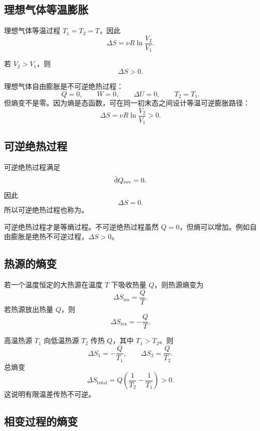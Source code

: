 \subsection{理想气体等温膨胀}

理想气体等温过程 \(T_1=T_2=T\)，因此
\[
  \Delta S
  =
  \nu R\ln\frac{V_2}{V_1}.
\]

若 \(V_2>V_1\)，则
\[
  \Delta S>0.
\]

\begin{KeyBox}[自由膨胀的熵变]
理想气体自由膨胀是不可逆绝热过程：
\[
  Q=0,\qquad W=0,\qquad \Delta U=0,\qquad T_2=T_1.
\]
但熵变不是零。因为熵是态函数，可在同一初末态之间设计等温可逆膨胀路径：
\[
  \boxed{
  \Delta S=\nu R\ln\frac{V_2}{V_1}>0
  }.
\]
\end{KeyBox}

\subsection{可逆绝热过程}

可逆绝热过程满足
\[
  \mathop{}\!\bar{\mathrm{d}} Q_{\mathrm{rev}}=0.
\]
因此
\[
  \boxed{
  \Delta S=0
  }.
\]
所以可逆绝热过程也称为。

\begin{WarnBox}[绝热过程不一定等熵]
可逆绝热过程才是等熵过程。不可逆绝热过程虽然 \(Q=0\)，但熵可以增加。例如自由膨胀是绝热不可逆过程，\(\Delta S>0\)。
\end{WarnBox}

\subsection{热源的熵变}

若一个温度恒定的大热源在温度 \(T\) 下吸收热量 \(Q\)，则热源熵变为
\[
  \boxed{
  \Delta S_{\mathrm{res}}=\frac{Q}{T}
  }.
\]
若热源放出热量 \(Q\)，则
\[
  \Delta S_{\mathrm{res}}=-\frac{Q}{T}.
\]

\begin{MethodBox}[有限温差传热的总熵变]
高温热源 \(T_1\) 向低温热源 \(T_2\) 传热 \(Q\)，其中 \(T_1>T_2\)。则
\[
  \Delta S_1=-\frac{Q}{T_1},
  \qquad
  \Delta S_2=\frac{Q}{T_2}.
\]
总熵变
\[
  \Delta S_{\mathrm{total}}
  =
  Q\left(\frac{1}{T_2}-\frac{1}{T_1}\right)>0.
\]
这说明有限温差传热不可逆。
\end{MethodBox}

\subsection{相变过程的熵变}

